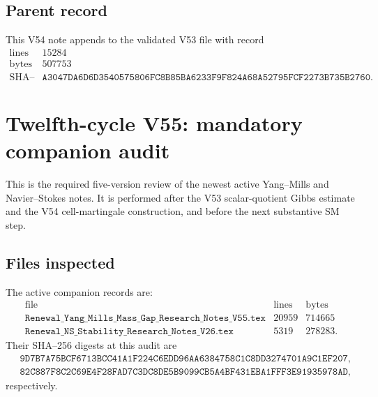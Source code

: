\documentclass[11pt]{article}
\theoremstyle{remark}
\begin{document}
\subsection{Parent record}

This V54 note appends to the validated V53 file with record
\[
\begin{array}{c|c}
\text{lines}&15284\\
\text{bytes}&507753\\
\text{SHA--256}&
\texttt{A3047DA6D6D3540575806FC8B85BA6233F9F824A68A52795FCF2273B735B2760}.
\end{array}
\]


\section{Twelfth-cycle V55: mandatory companion audit}
\label{sec:v12v55}

This is the required five-version review of the newest active
Yang--Mills and Navier--Stokes notes.  It is performed after the V53
scalar-quotient Gibbs estimate and the V54 cell-martingale
construction, and before the next substantive SM step.

\subsection{Files inspected}

The active companion records are:
\[
\begin{array}{c|r|r}
\text{file}&\text{lines}&\text{bytes}\\ \hline
\texttt{Renewal\_Yang\_Mills\_Mass\_Gap\_Research\_Notes\_V55.tex}
 &20959&714665\\
\texttt{Renewal\_NS\_Stability\_Research\_Notes\_V26.tex}
 &5319&278283.
\end{array}                                      \tag{55.1}
\]
Their SHA--256 digests at this audit are
\[
\begin{split}
 &\texttt{9D7B7A75BCF6713BCC41A1F224C6EDD96AA6384758C1C8DD3274701A9C1EF207},\\
 &\texttt{82C887F8C2C69E4F28FAD7C3DC8DE5B9099CB5A4BF431EBA1FFF3E91935978AD},
\end{split}                                      \tag{55.2}
\]
respectively.
\end{document}
